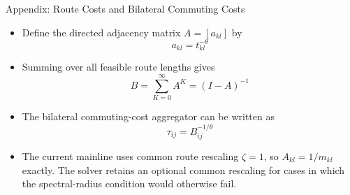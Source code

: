 \documentclass[11pt,aspectratio=169]{beamer}
\newcommand{\navback}[1]{\par\vspace{0.35em}\noindent\hfill\hyperlink{#1}{\beamerreturnbutton{back}}}
\begin{document}
\begin{frame}[label=approute]{Appendix: Route Costs and Bilateral Commuting Costs}
\begin{itemize}\small
  \item Define the directed adjacency matrix $A=[a_{kl}]$ by
  \vspace{-0.5em}\begin{equation}
    a_{kl} = t_{kl}^{-\theta}
  \end{equation}
  \item Summing over all feasible route lengths gives
  \vspace{-0.5em}\begin{equation}
    B = \sum_{K=0}^{\infty}A^K = (I-A)^{-1}
  \end{equation}
  \item The bilateral commuting-cost aggregator can be written as
  \vspace{-0.5em}\begin{equation}\label{eq:inverse}
    \tau_{ij} = B_{ij}^{-1/\theta}
  \end{equation}
  \vspace{-0.5em}
  \item The current mainline uses common route rescaling $\zeta=1$, so $A_{kl}=1/m_{kl}$ exactly. The solver retains an optional common rescaling for cases in which the spectral-radius condition would otherwise fail.
\end{itemize}
\navback{bilateral}
\end{frame}
\end{document}
